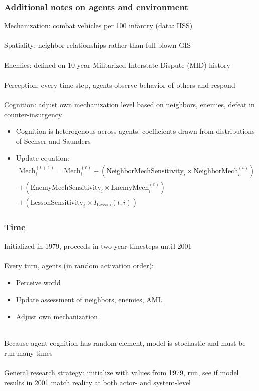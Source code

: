 \documentclass{beamer}
\begin{document}
\begin{frame}
	\frametitle{Additional notes on agents and environment}
	Mechanization: combat vehicles per 100 infantry (data: IISS)\\~\\

	Spatiality: neighbor relationships rather than full-blown GIS \\~\\

	Enemies: defined on 10-year Militarized Interstate Dispute (MID) history\\~\\

	Perception: every time step, agents observe behavior of others and respond\\~\\

	Cognition: adjust own mechanization level based on neighbors, enemies, defeat in counter-insurgency
	\begin{itemize}
		\item \small Cognition is heterogenous across agents:
			coefficients drawn from distributions of Sechser and
			Saunders 
		\item \small Update equation:
			\begin{multline}
				\textrm{Mech}_i^{(t+1)} = \textrm{Mech}_i^{(t)}
				+ (\textrm{NeighborMechSensitivity}_i \times \textrm{NeighborMech}_i^{(t)}) \\
				+ (\textrm{EnemyMechSensitivity}_i \times \textrm{EnemyMech}_i^{(t)}) \\
				+ (\textrm{LessonSensitivity}_i \times I_{\textrm{Lesson}}(t, i))
			\end{multline}
	\end{itemize}
\end{frame}

\begin{frame}
	\frametitle{Time}
	Initialized in 1979, proceeds in two-year timesteps until 2001 \\~\\

	Every turn, agents (in random activation order):
	\begin{itemize}
		\item \small Perceive world
		\item \small Update assessment of neighbors, enemies, AML
		\item \small Adjust own mechanization \\~\\
	\end{itemize}

	Because agent cognition has random element, model is stochastic and must
	be run many times \\~\\

	General research strategy: initialize with values from 1979, run, see if model results in 2001 match reality at both
	actor- and system-level
\end{frame}
\end{document}
